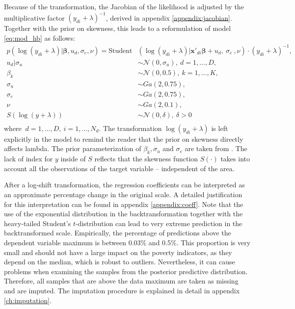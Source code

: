 Because of the transformation, the Jacobian of the likelihood is adjusted by the multiplicative factor $(y_{di} + \lambda)^{-1}$, derived in appendix \ref{appendix:jacobian}. Together with the prior on skewness, this leads to a reformulation of model \ref{eq:mod_hb} as follows:
\begin{equation}
    \begin{split}
        p(\log(y_{di} + \lambda) |\boldsymbol \beta, u_d, \sigma_e, \nu)   =        \text{Student}&(\log(y_{di} + \lambda)| \boldsymbol{x'}_{di} \boldsymbol \beta + u_d,\ \sigma_e\ , \nu)\cdot (y_{di} + \lambda)^{-1}, \\
        u_d | \sigma_u & \sim \mathcal N(0, \sigma_u),\ d = 1, ..., D, \\
        \beta_k & \sim \mathcal N(0, 0.5),\ k = 1, ..., K,\\
        \sigma_u & \sim Ga(2, 0.75), \\
        \sigma_e & \sim Ga(2, 0.75), \\
        \nu & \sim Ga(2, 0.1), \\
        S(\log(y + \lambda)) & \sim \mathcal N(0, \delta), ~ \delta > 0\\
    \end{split}
    \label{eq:trafo_hb}
\end{equation}
where $\ d = 1, ..., D,\ i = 1, ..., N_d$. The transformation $\log(y_{di} + \lambda)$ is left explicitly in the model to remind the reader that the prior on skewness directly affects lambda.
The prior parameterization of $\beta_k, \sigma_u$ and $\sigma_e$ are taken from \cite{morelli_hierarchical_2021}. The lack of index for $y$ inside of $S$ reflects that the skewness function $S(\cdot)$ takes into account all the observations of the target variable – independent of the area.

After a log-shift transformation, the regression coefficients can be interpreted as an approximate percentage change in the original scale.
A detailed justification for this interpretation can be found in appendix \ref{appendix:coeff}.
Note that the use of the exponential distribution in the backtransformation together with the heavy-tailed Student's $t$-distribution can lead to very extreme prediction in the backtransformed scale.
Empirically, the percentage of predictions above the dependent variable maximum is between 0.03\% and 0.5\%.
This proportion is very small and should not have a large impact on the poverty indicators, as they depend on the median, which is robust to outliers.
Nevertheless, it can cause problems when examining the samples from the posterior predictive distribution.
Therefore, all samples that are above the data maximum are taken as missing and are imputed.
The imputation procedure is explained in detail in appendix \ref{ch:imputation}.



